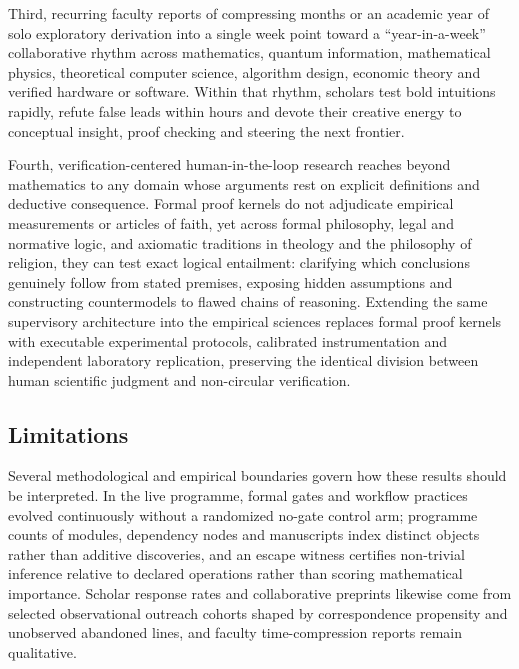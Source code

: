 \documentclass[11pt,a4paper]{article}
\begin{document}
Third, recurring faculty reports of compressing months or an academic year of
solo exploratory derivation into a single week point toward a
``year-in-a-week'' collaborative rhythm across mathematics, quantum
information, mathematical physics, theoretical computer science, algorithm
design, economic theory and verified hardware or software. Within that rhythm,
scholars test bold intuitions rapidly, refute false leads within hours and
devote their creative energy to conceptual insight, proof checking and steering
the next frontier.

Fourth, verification-centered human-in-the-loop research reaches beyond
mathematics to any domain whose arguments rest on explicit definitions and
deductive consequence. Formal proof kernels do not adjudicate empirical
measurements or articles of faith, yet across formal philosophy, legal and
normative logic, and axiomatic traditions in theology and the philosophy of
religion, they can test exact logical entailment: clarifying which conclusions
genuinely follow from stated premises, exposing hidden assumptions and
constructing countermodels to flawed chains of reasoning. Extending the same
supervisory architecture into the empirical sciences replaces formal proof
kernels with executable experimental protocols, calibrated instrumentation and
independent laboratory replication, preserving the identical division between
human scientific judgment and non-circular verification.

\subsection{Limitations}
Several methodological and empirical boundaries govern how these results should
be interpreted. In the live programme, formal gates and workflow practices
evolved continuously without a randomized no-gate control arm; programme counts
of modules, dependency nodes and manuscripts index distinct objects rather than
additive discoveries, and an escape witness certifies non-trivial inference
relative to declared operations rather than scoring mathematical importance.
Scholar response rates and collaborative preprints likewise come from selected
observational outreach cohorts shaped by correspondence propensity and
unobserved abandoned lines, and faculty time-compression reports remain
qualitative.
\end{document}
